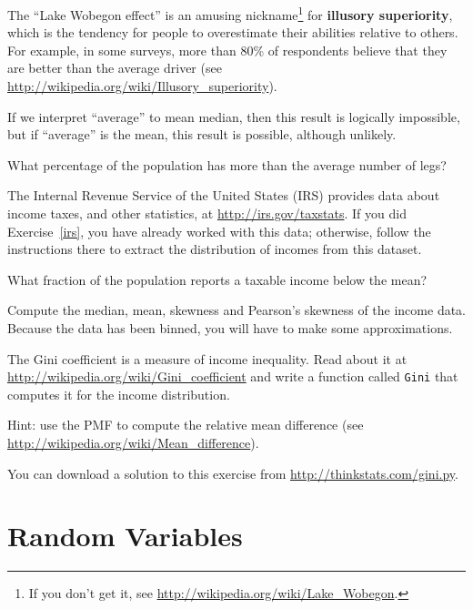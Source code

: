 \documentclass[12pt]{book}
\begin{document}
\begin{exercise}
The ``Lake Wobegon effect'' is an amusing nickname\footnote{If you
  don't get it, see \url{http://wikipedia.org/wiki/Lake_Wobegon}.} for {\bf
  illusory superiority}, which is the tendency for people to
overestimate their abilities relative to others.  For example, in some
surveys, more than 80\% of respondents believe that they are better
than the average driver (see
  \url{http://wikipedia.org/wiki/Illusory_superiority}).

If we interpret ``average'' to mean median, then this result is
logically impossible, but if ``average'' is the mean, this result is
possible, although unlikely.

What percentage of the population has more than the average number
of legs?

\end{exercise}


\begin{exercise}
The Internal Revenue Service of the United States (IRS) provides data
about income taxes, and other statistics, at \url{http://irs.gov/taxstats}.
If you did Exercise~\ref{irs}, you have already worked with this data;
otherwise, follow the instructions there to extract the distribution
of incomes from this dataset.

What fraction of the population reports a taxable income below the
mean?

Compute the median, mean, skewness and Pearson's skewness of the income
data.  Because the data has been binned, you will have to make
some approximations.

The Gini coefficient is a measure of income inequality.
Read about it at \url{http://wikipedia.org/wiki/Gini_coefficient} and write a
function called {\tt Gini} that computes it for the income
distribution.

Hint: use the PMF to compute the relative mean difference
(see \url{http://wikipedia.org/wiki/Mean_difference}).

You can download a solution to this exercise from \url{http://thinkstats.com/gini.py}.

\end{exercise}


\section{Random Variables}
\end{document}
